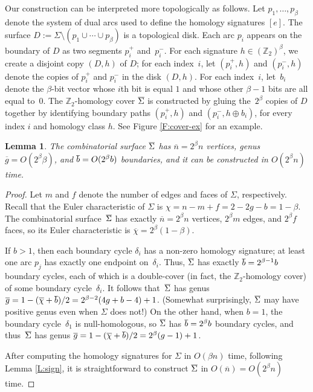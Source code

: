 \documentclass[twoside,leqno,twocolumn]{article}
\def\Z{\mathbb{Z}}
\def\dualarc{p}
\def\Sigmabar{\overline{\smash{\Sigma}\vphantom{t}}}
\def\bbar{\overline{\smash{b}\vphantom{t}}}
\def\nbar{\overline{n}}
\def\gbar{\overline{g}}
\def\chibar{\overline{\chi}}
\newtheorem{lemma}[theorem]{Lemma}
\begin{document}
Our construction can be interpreted more topologically as follows.  Let $\dualarc_1, \dots, \dualarc_\beta$ denote the system of dual arcs used to define the homology signatures $[e]$.  The surface $D := \Sigma\setminus(\dualarc_1\cup\cdots\cup \dualarc_\beta)$ is a topological disk.  Each arc $\dualarc_i$ appears on the boundary of $D$ as two segments $\dualarc^+_i$ and~$\dualarc^-_i$.  For each signature $h\in (\Z_2)^\beta$, we create a disjoint copy $(D,h)$ of $D$; for each index~$i$, let $(\dualarc^+_i, h)$ and $(\dualarc^-_i, h)$ denote the copies of $\dualarc^+_i$ and $\dualarc^-_i$ in the disk $(D, h)$.  For each index~$i$, let~$b_i$ denote the $\beta$-bit vector whose $i$th bit is equal $1$ and whose other $\beta-1$ bits are all equal to~$0$.  The $\Z_2$-homology cover $\Sigmabar$ is constructed by gluing the~$2^\beta$ copies of $D$ together by identifying boundary paths $(\dualarc^+_i,h)$ and $(\dualarc^-_i, h\oplus b_i)$, for every index $i$ and homology class $h$.  See Figure \ref{F:cover-ex} for an example.

\begin{lemma}
\label{L:cover-cxy}
The combinatorial surface $\Sigmabar$ has $\nbar = 2^\beta n$ vertices, genus $\gbar = O(2^\beta \beta)$, and $\bbar = O(2^\beta b)$ boundaries, and it can be constructed in $O(2^\beta n)$ time.
\end{lemma}

\begin{proof}
Let $m$ and $f$ denote the number of edges and faces of $\Sigma$, respectively.  Recall that the Euler characteristic of $\Sigma$ is $\chi = n - m + f = 2 - 2g - b = 1-\beta$.  The combinatorial surface~$\Sigmabar$ has exactly $\nbar = 2^\beta n$ vertices, $2^\beta m$ edges, and $2^\beta f$ faces, so its Euler characteristic is $\chibar = 2^\beta (1-\beta)$.

If $b>1$, then each boundary cycle $\delta_i$ has a non-zero homology signature; at least one arc $\dualarc_j$ has exactly one endpoint on~$\delta_i$.  Thus, $\Sigmabar$ has exactly $\bbar = 2^{\beta-1} b$ boundary cycles, each of which is a double-cover (in fact, the $\Z_2$-homology cover) of some boundary cycle~$\delta_i$.  It follows that~$\Sigmabar$ has genus $\gbar = 1-(\chibar+\bbar)/2 = {2^{\beta-2} ({4g+b-4}) + 1}$.  (Somewhat surprisingly, $\Sigmabar$ may have positive genus even when $\Sigma$ does not!)  On the other hand, when $b=1$, the boundary cycle~$\delta_1$ is null-homologous, so $\Sigmabar$ has $\bbar = 2^\beta b$ boundary cycles, and thus~$\Sigmabar$ has genus $\gbar = {1-(\chibar+\bbar)/2} =  {2^\beta (g-1) + 1}$.

After computing the homology signatures for $\Sigma$ in $O(\beta n)$ time, following Lemma \ref{L:sign}, it is straightforward to construct $\Sigmabar$ in $O(\nbar) = O(2^\beta n)$ time.
\end{proof}
\end{document}
